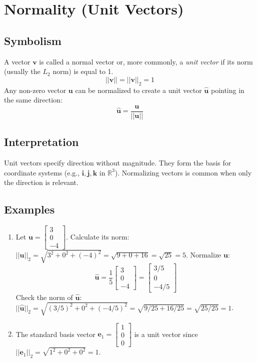 \documentclass{article}
\newcommand{\vect}[1]{\bm{#1}} %
\newcommand{\R}{\mathbb{R}}    %
\begin{document}
\section{Normality (Unit Vectors)}

\subsection*{Symbolism}
A vector $\vect{v}$ is called a normal vector or, more commonly, a \emph{unit vector} if its norm (usually the $L_2$ norm) is equal to 1.
\[ ||\vect{v}|| = ||\vect{v}||_2 = 1 \]
Any non-zero vector $\vect{u}$ can be normalized to create a unit vector $\hat{\vect{u}}$ pointing in the same direction:
\[ \hat{\vect{u}} = \frac{\vect{u}}{||\vect{u}||} \]

\subsection*{Interpretation}
Unit vectors specify direction without magnitude. They form the basis for coordinate systems (e.g., $\vect{i}, \vect{j}, \vect{k}$ in $\R^3$). Normalizing vectors is common when only the direction is relevant.

\subsection*{Examples}
\begin{enumerate}
    \item Let $\vect{u} = \begin{bmatrix} 3 \\ 0 \\ -4 \end{bmatrix}$.
    Calculate its norm: $||\vect{u}||_2 = \sqrt{3^2 + 0^2 + (-4)^2} = \sqrt{9 + 0 + 16} = \sqrt{25} = 5$.
    Normalize $\vect{u}$:
    \[ \hat{\vect{u}} = \frac{1}{5} \begin{bmatrix} 3 \\ 0 \\ -4 \end{bmatrix} = \begin{bmatrix} 3/5 \\ 0 \\ -4/5 \end{bmatrix} \]
    Check the norm of $\hat{\vect{u}}$: $||\hat{\vect{u}}||_2 = \sqrt{(3/5)^2 + 0^2 + (-4/5)^2} = \sqrt{9/25 + 16/25} = \sqrt{25/25} = 1$.

    \item The standard basis vector $\vect{e}_1 = \begin{bmatrix} 1 \\ 0 \\ 0 \end{bmatrix}$ is a unit vector since $||\vect{e}_1||_2 = \sqrt{1^2+0^2+0^2} = 1$.
\end{enumerate}
\end{document}
